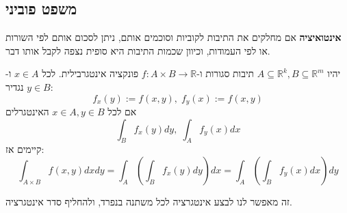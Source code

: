 \documentclass{tstextbook}
\begin{document}
\subsection{משפט פוביני}

\textbf{אינטואיציה} אם מחלקים את התיבות לקוביות וסוכמים אותם, ניתן לסכום אותם לפי השורות או לפי העמודות, וכיוון שכמות התיבות היא סופית נצפה לקבל אותו דבר.

\begin{theorem}[פוביני]
יהיו \(A\subseteq \mathbb{R}^k,B\subseteq \mathbb{R}^m\) תיבות סגורות ו-\(f:A\times B\to\mathbb{R}\) פונקציה אינטגרבילית. לכל \(x  \in A\) ו-\(y\in B\) נגדיר:
$$f_{x}(y):=f(x,y),\;f_{y}(x):=f(x,y)$$
אם לכל \(x \in A,y \in B\) האינטגרלים$$\int_{B}f_{x}(y)d y,\;\int_{A}f_{y}(x)d x$$
קיימים אז:
$$\int_{A\times B}f(x,y)d x d y=\int_{A}\left( \int_{B}f_{x}(y)d y \right)d x=\int_{A}\left( \int_{B}f_{y}(x)d x \right)d y$$

\end{theorem}
זה מאפשר לנו לבצע אינטגרציה לכל משתנה בנפרד, ולהחליף סדר אינטגרציה.
\end{document}
